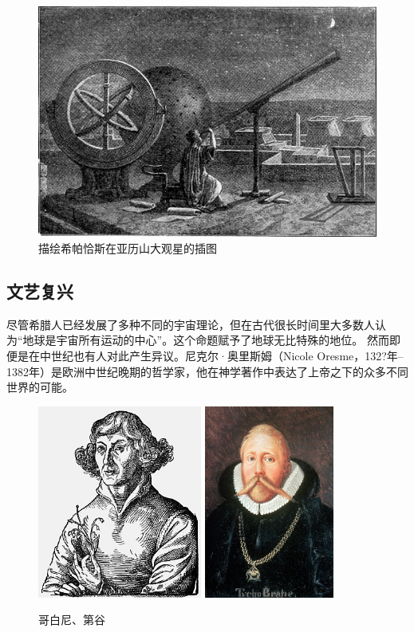 \documentclass[a4paper,10.5pt]{book}
\begin{document}
\begin{figure}[ht]
\centering
\includegraphics[width=5.0in]{images/1_03-Observatory_in_Alexandria_at_the_Time_of_Hipparchus.jpg}
\caption{描绘希帕恰斯在亚历山大观星的插图}
\end{figure}

\subsection{文艺复兴}

尽管希腊人已经发展了多种不同的宇宙理论，但在古代很长时间里大多数人认为“地球是宇宙所有运动的中心”。这个命题赋予了地球无比特殊的地位。
然而即便是在中世纪也有人对此产生异议。尼克尔·奥里斯姆（Nicole Oresme，132?年–1382年）是欧洲中世纪晚期的哲学家，他在神学著作中表达了上帝之下的众多不同世界的可能。

\begin{figure}[ht]
\centering
\includegraphics[height=2.5in]{images/1_05-Mikolaj_Kopernik.jpg}
\includegraphics[height=2.5in]{images/1_08-Tycho_Brahe.jpg}
\caption{哥白尼、第谷}
\end{figure}
\end{document}
